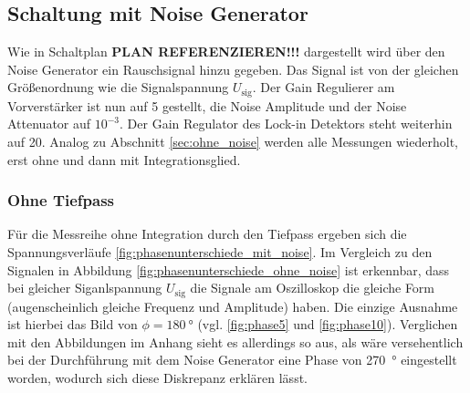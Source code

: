 \subsection{Schaltung mit Noise Generator}
\label{sec:mit_noise}
Wie in Schaltplan \textbf{PLAN REFERENZIEREN!!!} dargestellt wird über den Noise Generator ein Rauschsignal hinzu gegeben.
Das Signal ist von der gleichen Größenordnung wie die Signalspannung $U_\text{sig}$.
Der Gain Regulierer am Vorverstärker ist nun auf 5 gestellt, die Noise Amplitude und der Noise Attenuator auf $10^{-3}$.
Der Gain Regulator des Lock-in Detektors steht weiterhin auf 20.
Analog zu Abschnitt \ref{sec:ohne_noise} werden alle Messungen wiederholt, erst ohne und dann mit Integrationsglied.


\subsubsection{Ohne Tiefpass}
\label{sec:mit_noise_ohne_tp}
Für die Messreihe ohne Integration durch den Tiefpass ergeben sich die Spannungsverläufe \ref{fig:phasenunterschiede_mit_noise}.
Im Vergleich zu den Signalen in Abbildung \ref{fig:phasenunterschiede_ohne_noise} ist erkennbar, dass bei gleicher Siganlspannung $U_\text{sig}$
die Signale am Oszilloskop die gleiche Form (augenscheinlich gleiche Frequenz und Amplitude) haben.
Die einzige Ausnahme ist hierbei das Bild von $\phi = \qty[]{180}{\degree}$ (vgl. \ref{fig:phase5} und \ref{fig:phase10}).
Verglichen mit den Abbildungen im Anhang sieht es allerdings so aus, als wäre versehentlich bei der Durchführung mit dem Noise Generator eine Phase von 
\qty[]{270}{\degree} eingestellt worden, wodurch sich diese Diskrepanz erklären lässt.
%
%

